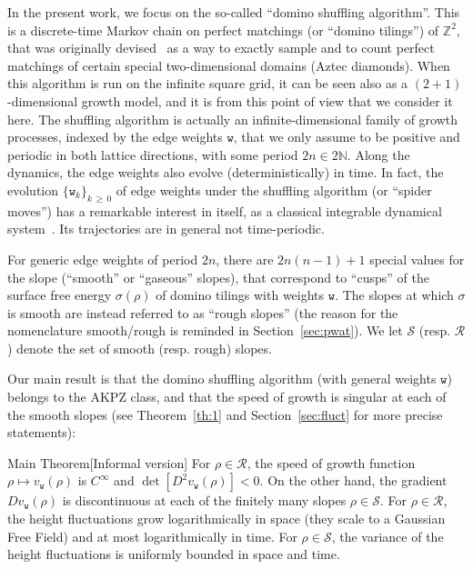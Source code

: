 \documentclass[AHL,Unicode,longabstracts,published]{cedram}
\newcommand{\ttw}{\mathtt{w}}
\newcommand{\bbZ}{\mathbb{Z}}
\newcommand{\bbN}{\mathbb{N}}
\newcommand{\clS}{\mathcal{S}}
\newcommand{\clR}{\mathcal{R}}
\newcommand{\ttw}{\mathtt{w}}
\begin{document}
In the present work, we focus on the so-called ``domino shuffling algorithm''. This is a discrete-time Markov chain on perfect matchings (or ``domino tilings'') of $\bbZ^2$, that was originally devised~\cite{EKLP92,EKLP92b,Pro03} as a way to exactly sample and to count perfect matchings of certain special two-dimensional domains (Aztec diamonds). When this algorithm is run on the infinite square grid, it can be seen also as a $(2+1)$-dimensional growth model, and it is from this point of view that we consider it here. The shuffling algorithm is actually an infinite-dimensional family of growth processes, indexed by the edge weights $\ttw$, that we only assume to be positive and periodic in both lattice directions, with some period $2n\in 2\bbN$. Along the dynamics, the edge weights also evolve (deterministically) in time. In fact, the evolution $\{\ttw_k\}_{k\,\ge\,0}$ of edge weights under the shuffling algorithm (or ``spider moves'') has a remarkable interest in itself, as a classical integrable dynamical system~\cite{GK13}. Its trajectories are in general not time-periodic.

For generic edge weights of period $2n$, there are $2n(n-1)+1$ special values for the slope (``smooth'' or ``gaseous'' slopes), that correspond to ``cusps'' of the surface free energy $\sigma(\rho)$ of domino tilings with weights $\ttw$. The slopes at which $\sigma$ is smooth are instead referred to as ``rough slopes'' (the reason for the nomenclature smooth/rough is reminded in Section~\ref{sec:pwat}). We let $\clS$ (resp. $\clR$) denote the set of smooth (resp. rough) slopes.

Our main result is that the domino shuffling algorithm (with general weights $\ttw$) belongs to the AKPZ class, and that the speed of growth is singular at each of the smooth slopes (see Theorem~\ref{th:1} and Section~\ref{sec:fluct} for more precise statements):

\begin{enonce*}[plain]{Main Theorem}[Informal version]
For $\rho\in\clR$, the speed of growth function $\rho\mapsto v_{\ttw}(\rho)$ is $C^\infty$ and $\det[D^2v_{\ttw}(\rho)]<0$. On the other hand, the gradient $D v_{\ttw}(\rho)$ is discontinuous at each of the finitely many slopes $\rho\in\clS$. For $\rho\in \clR$, the height fluctuations grow logarithmically in space (they scale to a Gaussian Free Field) and at most logarithmically in time. For $\rho\in \clS$, the variance of the height fluctuations is uniformly bounded in space and time.
\end{enonce*}
\end{document}
